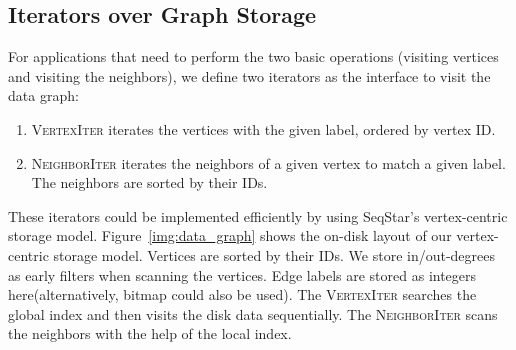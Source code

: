 \subsection{Iterators over Graph Storage}\label{sec:storage_iterators}
For applications that need to perform the two basic operations (visiting vertices and visiting the neighbors),
we define two iterators as the interface to visit the data graph:
\begin{enumerate}[noitemsep]
\item \textsc{VertexIter} iterates the vertices with the given label, ordered by vertex ID. 
\item \textsc{NeighborIter} iterates the neighbors of a given vertex to match a given label. The neighbors are sorted by their IDs.

\end{enumerate}

These iterators could be implemented efficiently by using SeqStar's vertex-centric storage model.
Figure~\ref{img:data_graph} shows the on-disk layout of our vertex-centric storage model.
Vertices are sorted by their IDs. We store in/out-degrees as early filters when scanning the vertices.
Edge labels are stored as integers here(alternatively, bitmap could also be used).
The \textsc{VertexIter} searches the global index and then visits the disk data sequentially.
The \textsc{NeighborIter} scans the neighbors with the help of the local index.

